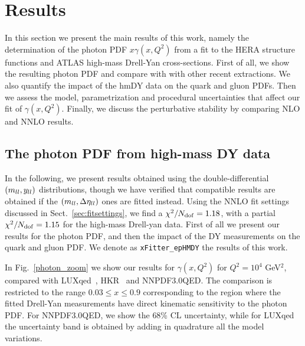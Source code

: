 \section{Results}
\label{sec:results}

In this section we present the main results of this work,
namely the determination
of the photon PDF $x\gamma(x,Q^2)$ from a fit to the HERA structure functions
and ATLAS high-mass Drell-Yan cross-sections.
%
First of all, we show the resulting photon PDF and compare with
with other recent extractions.
%
We also quantify the impact of the hmDY data on the quark and
gluon PDFs.
%
Then we assess the model, parametrization
and procedural uncertainties that affect our fit of $\gamma(x,Q^2)$.
%
Finally, we discuss the perturbative stability by comparing
NLO and NNLO results.

\subsection{The photon PDF from high-mass DY data}

In the following, we  present results obtained using the
double-differential $\left( m_{ll},y_{ll}\right)$ distributions, though
we have verified that compatible results
are obtained if the $\left( m_{ll},\Delta\eta_{ll}\right)$ ones are fitted
instead.
%
Using the NNLO fit settings discussed in Sect.~\ref{sec:fitsettings}, we find
a $\chi^{2}/N_{\rm dof} = 1.18$,
with a partial $\chi^2/N_{\rm dof} = 1.15$ for the high-mass Drell-yan data.
%
First of all we present our results for the photon PDF, and then the impact
of the DY measurements on the quark and gluon PDF.
%
We denote as {\tt xFitter\_epHMDY} the results of this work.

In Fig.~\ref{photon_zoom} we show our results
for $\gamma(x,Q^2)$ for $Q^2=10^4$ GeV$^2$,
compared with LUXqed~\cite{Manohar:2016nzj}, HKR~\cite{Harland-Lang:2016apc}
and NNPDF3.0QED.
%
The comparison is restricted to the range $0.03 \le x \le 0.9$ corresponding
to the region where the fitted Drell-Yan measurements have direct kinematic sensitivity
to the photon PDF.
%
For NNPDF3.0QED, we show the 68\% CL uncertainty, while for LUXqed the uncertainty band
is obtained by adding in quadrature all the model variations.

